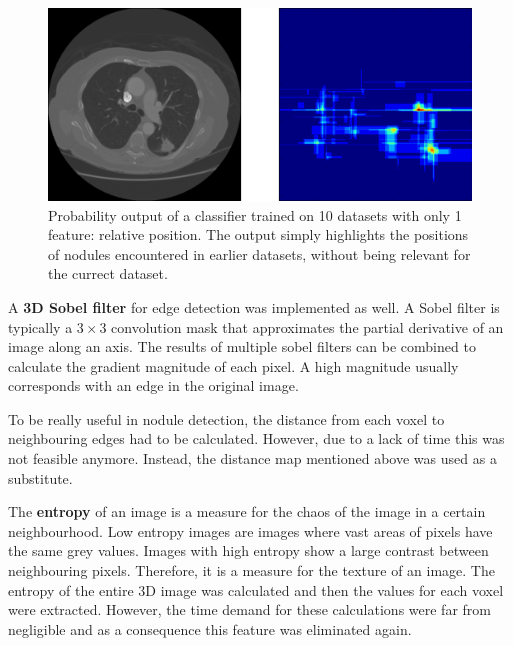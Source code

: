 \begin{figure}[ht]
\begin{center}
  \includegraphics[width=\linewidth]{img/RelPositionFeature.png}
  \caption[]{Probability output of a classifier trained on 10 datasets with only
  1 feature: relative position. The output simply highlights the positions of
  nodules encountered in earlier datasets, without being relevant for the
  currect dataset.}
  \label{fig:posFeature}
\end{center}
\end{figure}

A \textbf{3D Sobel filter} for edge detection was implemented as well. A Sobel
filter is typically a $3 \times 3$ convolution mask that approximates the
partial derivative of an image along an axis. The results of multiple sobel
filters can be combined to calculate the gradient magnitude of each pixel. A
high magnitude usually corresponds with an edge in the original image.

To be really useful in nodule detection, the distance from each voxel to
neighbouring edges had to be calculated. However, due to a lack of time this was
not feasible anymore. Instead, the distance map mentioned above was used as a
substitute.

The \textbf{entropy} of an image is a measure for the chaos of the image in a
certain neighbourhood. Low entropy images are images where vast areas of pixels
have the same grey values. Images with high entropy show a large contrast
between neighbouring pixels. Therefore, it is a measure for the texture of an
image. The entropy of the entire 3D image was calculated and then the values for
each voxel were extracted. However, the time demand for these calculations were
far from negligible and as a consequence this feature was eliminated again.

